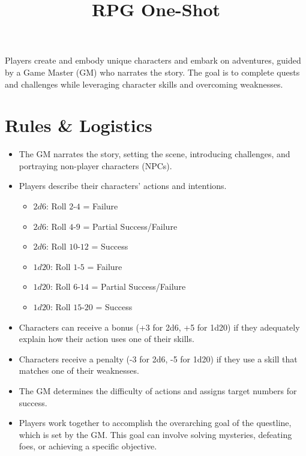 \documentclass{article}
\title{RPG One-Shot}
\date{} %
\begin{document}
\maketitle %

\vspace{-1cm}

Players create and embody unique characters and embark on adventures, guided by a Game Master (GM) who narrates the story. The goal is to complete quests and challenges while leveraging character skills and overcoming weaknesses.


\section*{Rules \& Logistics}



\begin{itemize}
  \item The GM narrates the story, setting the scene, introducing challenges, and portraying non-player characters (NPCs).
  \item Players describe their characters' actions and intentions. 
  \begin{multicols}{2}
    \begin{itemize}
      \item $2d6$: Roll $2$-$4$ = Failure
      \item $2d6$: Roll $4$-$9$ = Partial Success/Failure
      \item $2d6$: Roll $10$-$12$ = Success
      \item $1d20$: Roll $1$-$5$ = Failure
      \item $1d20$: Roll $6$-$14$ = Partial Success/Failure
      \item $1d20$: Roll $15$-$20$ = Success
    \end{itemize}
  \end{multicols}
  \item Characters can receive a bonus (+3 for 2d6, +5 for 1d20) if they adequately explain how their action uses one of their skills.
  \item   Characters receive a penalty (-3 for 2d6, -5 for 1d20) if they use a skill that matches one of their weaknesses.    
  \item The GM determines the difficulty of actions and assigns target numbers for success.      
  \item Players work together to accomplish the overarching goal of the questline, which is set by the GM. This goal can involve solving mysteries, defeating foes, or achieving a specific objective.
\end{itemize}
\end{document}
